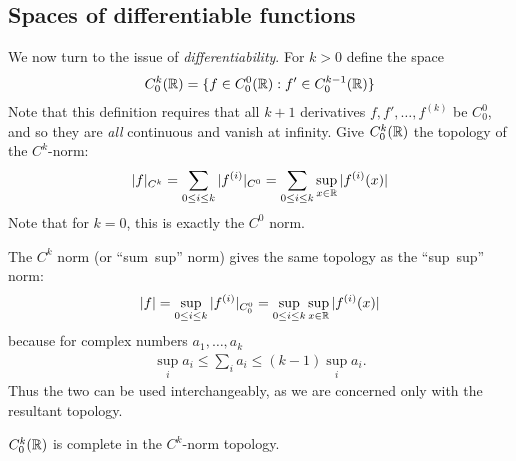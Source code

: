    \subsection{Spaces of differentiable functions}
      We now turn to the issue of \emph{differentiability}.
      For $k>0$ define the space 
      \begin{align*}
        C^k_0(\mathbb{R}) = \{f\in C^0_0(\mathbb{R}) : f'\in C^{k-1}_0(\mathbb{R})\}
      \end{align*}
      Note that this definition requires that all $k+1$ derivatives $f,f',\ldots,f^{(k)}$ be $C^0_0$, and so they are \emph{all} continuous and vanish at infinity.
      Give $C^k_0(\mathbb{R})$ the topology of the $C^k$-norm:
      \begin{align*}
        |f|_{C^k} = \sum_{0\le i\le k} |f^{(i)}|_{C^0} = \sum_{0\le i\le k} \sup_{x\in\mathbb{R}}|f^{(i)}(x)|
      \end{align*}
      Note that for $k=0$, this is exactly the $C^0$ norm.
      \begin{rmk}
        The $C^k$ norm (or ``sum~sup'' norm) gives the same topology as the ``sup~sup'' norm:
        \begin{align*}
          |f|=\sup_{0\le i\le k}|f^{(i)}|_{C^0_0}=\sup_{0\le i\le k}\sup_{x\in\mathbb{R}}|f^{(i)}(x)|
        \end{align*}
        because for complex numbers $a_1,\ldots,a_k$
        \begin{align*}
          \sup_i a_i \le \sum_i a_i \le (k-1) \sup_i a_i\text{.}
        \end{align*}
        Thus the two can be used interchangeably, as we are concerned only with the resultant topology.
      \end{rmk}
      \begin{rmk}
      \end{rmk}
      \begin{thm}
        \label{thm:ck0complete}
        $C^k_0(\mathbb{R})$ is complete in the $C^k$-norm topology.
      \end{thm}

